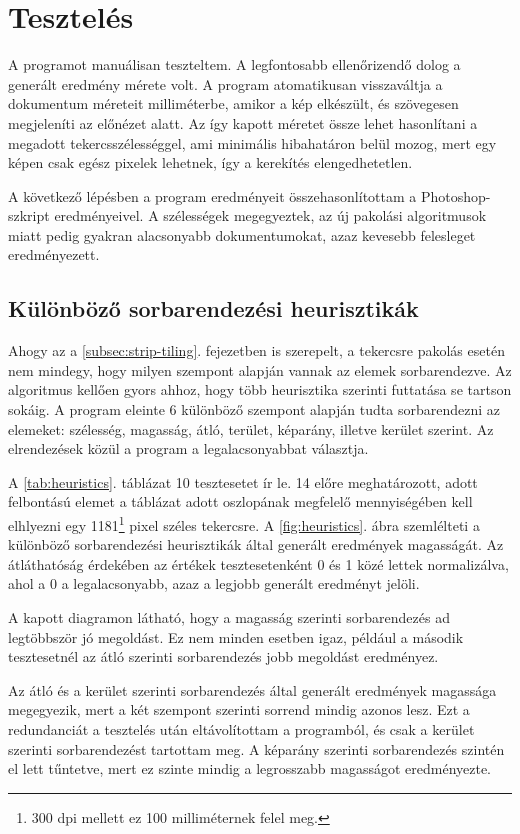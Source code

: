 \chapter{Tesztelés}

A programot manuálisan teszteltem. A legfontosabb ellenőrizendő dolog a generált eredmény mérete volt. A program atomatikusan visszaváltja a dokumentum méreteit milliméterbe, amikor a kép elkészült, és szövegesen megjeleníti az előnézet alatt. Az így kapott méretet össze lehet hasonlítani a megadott tekercsszélességgel, ami minimális hibahatáron belül mozog, mert egy képen csak egész pixelek lehetnek, így a kerekítés elengedhetetlen.

A következő lépésben a program eredményeit összehasonlítottam a Photoshop-szkript eredményeivel. A szélességek megegyeztek, az új pakolási algoritmusok miatt pedig gyakran alacsonyabb dokumentumokat, azaz kevesebb felesleget eredményezett.

\section{Különböző sorbarendezési heurisztikák}

Ahogy az a \ref{subsec:strip-tiling}. fejezetben is szerepelt, a tekercsre pakolás esetén nem mindegy, hogy milyen szempont alapján vannak az elemek sorbarendezve. Az algoritmus kellően gyors ahhoz, hogy több heurisztika szerinti futtatása se tartson sokáig. A program eleinte 6 különböző szempont alapján tudta sorbarendezni az elemeket: szélesség, magasság, átló, terület, képarány, illetve kerület szerint. Az elrendezések közül a program a legalacsonyabbat választja.

A \ref{tab:heuristics}. táblázat 10 tesztesetet ír le. 14 előre meghatározott, adott felbontású elemet a táblázat adott oszlopának megfelelő mennyiségében kell elhlyezni egy 1181\footnote[10]{300 dpi mellett ez 100 milliméternek felel meg.} pixel széles tekercsre. A \ref{fig:heuristics}. ábra szemlélteti a különböző sorbarendezési heurisztikák által generált eredmények magasságát. Az átláthatóság érdekében az értékek tesztesetenként 0 és 1 közé lettek normalizálva, ahol a 0 a legalacsonyabb, azaz a legjobb generált eredményt jelöli.

A kapott diagramon látható, hogy a magasság szerinti sorbarendezés ad legtöbbször jó megoldást. Ez nem minden esetben igaz, például a második tesztesetnél az átló szerinti sorbarendezés jobb megoldást eredményez.

Az átló és a kerület szerinti sorbarendezés által generált eredmények magassága megegyezik, mert a két szempont szerinti sorrend mindig azonos lesz. Ezt a redundanciát a tesztelés után eltávolítottam a programból, és csak a kerület szerinti sorbarendezést tartottam meg. A képarány szerinti sorbarendezés szintén el lett tűntetve, mert ez szinte mindig a legrosszabb magasságot eredményezte.

